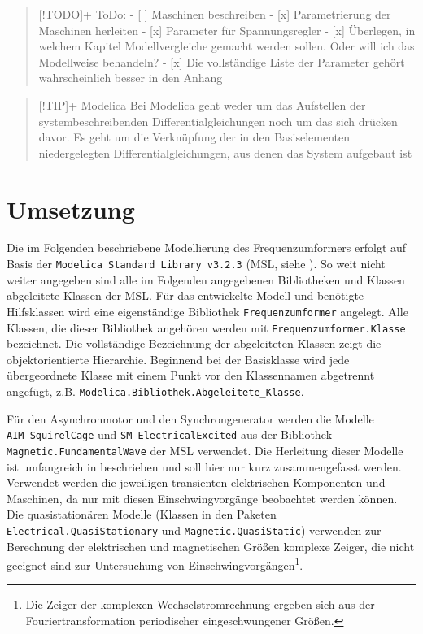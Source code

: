\begin{quote}
{[}!TODO{]}+ ToDo: - {[} {]} Maschinen beschreiben - {[}x{]}
Parametrierung der Maschinen herleiten - {[}x{]} Parameter für
Spannungsregler - {[}x{]} Überlegen, in welchem Kapitel Modellvergleiche
gemacht werden sollen. Oder will ich das Modellweise behandeln? -
{[}x{]} Die vollständige Liste der Parameter gehört wahrscheinlich
besser in den Anhang
\end{quote}

\begin{quote}
{[}!TIP{]}+ Modelica Bei Modelica geht weder um das Aufstellen der
systembeschreibenden Differentialgleichungen noch um das sich drücken
davor. Es geht um die Verknüpfung der in den Basiselementen
niedergelegten Differentialgleichungen, aus denen das System aufgebaut
ist
\end{quote}

\hypertarget{umsetzung}{%
\section{Umsetzung}\label{umsetzung}}

Die im Folgenden beschriebene Modellierung des Frequenzumformers erfolgt
auf Basis der \texttt{Modelica\ Standard\ Library\ v3.2.3} (MSL, siehe
\cite[]{modelicaassociationModelicaStandardLibrary2020}). So weit nicht
weiter angegeben sind alle im Folgenden angegebenen Bibliotheken und
Klassen abgeleitete Klassen der MSL. Für das entwickelte Modell und
benötigte Hilfsklassen wird eine eigenständige Bibliothek
\texttt{Frequenzumformer} angelegt. Alle Klassen, die dieser Bibliothek
angehören werden mit \texttt{Frequenzumformer.Klasse} bezeichnet. Die
vollständige Bezeichnung der abgeleiteten Klassen zeigt die
objektorientierte Hierarchie. Beginnend bei der Basisklasse wird jede
übergeordnete Klasse mit einem Punkt vor den Klassennamen abgetrennt
angefügt, z.B. \texttt{Modelica.Bibliothek.Abgeleitete\_Klasse}.

Für den Asynchronmotor und den Synchrongenerator werden die Modelle
\texttt{AIM\_SquirelCage} und \texttt{SM\_ElectricalExcited} aus der
Bibliothek \texttt{Magnetic.FundamentalWave} der MSL verwendet. Die
Herleitung dieser Modelle ist umfangreich in
\cite[]{kralModelicaObjektorientierteModellbildung2019} beschrieben und
soll hier nur kurz zusammengefasst werden. Verwendet werden die
jeweiligen transienten elektrischen Komponenten und Maschinen, da nur
mit diesen Einschwingvorgänge beobachtet werden können. Die
quasistationären Modelle (Klassen in den Paketen
\texttt{Electrical.QuasiStationary} und \texttt{Magnetic.QuasiStatic})
verwenden zur Berechnung der elektrischen und magnetischen Größen
komplexe Zeiger, die nicht geeignet sind zur Untersuchung von
Einschwingvorgängen\footnote{Die Zeiger der komplexen
  Wechselstromrechnung ergeben sich aus der Fouriertransformation
  periodischer eingeschwungener Größen.}.

